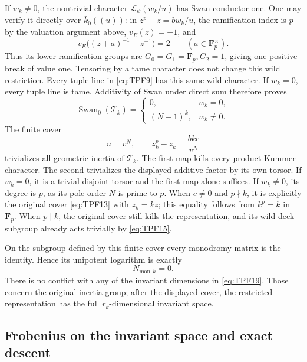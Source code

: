 If \(w_k\ne0\), the nontrivial character
\(\mathcal L_\psi(w_k/u)\) has Swan conductor one.
One may verify it directly over \(\bar k_0((u))\):
in \(z^p-z=bw_k/u\), the ramification index is \(p\)
by the valuation argument above, \(v_E(z)=-1\), and
\[
 v_E\bigl((z+a)^{-1}-z^{-1}\bigr)=2
                         \qquad(a\in\mathbf F_p^\times).
 \tag{TPF.21}\label{eq:TPF21}
\]
Thus its lower ramification groups are
\(G_0=G_1=\mathbf F_p,G_2=1\), giving one positive
break of value one. Tensoring by a tame character
does not change this wild restriction. Every tuple
line in \eqref{eq:TPF9} has this same wild character.
If \(w_k=0\), every tuple line is tame. Additivity of
Swan under direct sum therefore proves
\[
 \boxed{\displaystyle
 \operatorname{Swan}_0(\mathcal T_k)=
 \begin{cases}
 0,&w_k=0,\\
 (N-1)^k,&w_k\ne0 .
 \end{cases}}
 \tag{TPF.22}\label{eq:TPF22}
\]
The finite cover
\[
 u=v^N,\qquad z_k^p-z_k=\frac{bkc}{v^N}
 \tag{TPF.23}\label{eq:TPF23}
\]
trivializes all geometric inertia of \(\mathcal T_k\).
The first map kills every product Kummer character.
The second trivializes the displayed additive factor
by its own torsor. If \(w_k=0\), it is a trivial
disjoint torsor and the first map alone suffices.
If \(w_k\ne0\), its degree is \(p\), as its pole order
\(N\) is prime to \(p\). When \(c\ne0\) and
\(p\nmid k\), it is explicitly the original cover
\eqref{eq:TPF13} with \(z_k=kz\); this equality follows
from \(k^p=k\) in \(\mathbf F_p\).
When \(p\mid k\), the original cover still kills the
representation, and its wild deck subgroup already
acts trivially by \eqref{eq:TPF15}.

On the subgroup defined by this finite cover every
monodromy matrix is the identity. Hence its unipotent
logarithm is exactly
\[
 N_{\mathrm{mon},k}=0 .
 \tag{TPF.24}\label{eq:TPF24}
\]
There is no conflict with any of the invariant
dimensions in \eqref{eq:TPF19}. Those concern the
original inertia group; after the displayed cover,
the restricted representation has the full
\(r_k\)-dimensional invariant space.

\subsection{Frobenius on the invariant space and exact descent}

